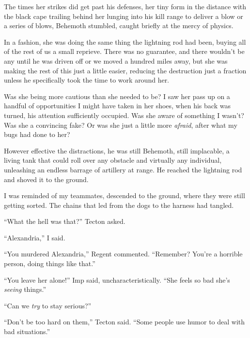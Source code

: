 The times her strikes did get past his defenses, her tiny form in the distance with the black cape trailing behind her lunging into his kill range to deliver a blow or a series of blows, Behemoth stumbled, caught briefly at the mercy of physics.



In a fashion, she was doing the same thing the lightning rod had been, buying all of the rest of us a small reprieve.  There was no guarantee, and there wouldn't be any until he was driven off or we moved a hundred miles away, but she was making the rest of this just a little easier, reducing the destruction just a fraction unless he specifically took the time to work around her.



Was she being more cautious than she needed to be?  I saw her pass up on a handful of opportunities I might have taken in her shoes, when his back was turned, his attention sufficiently occupied.  Was she aware of something I wasn't?  Was she a convincing fake?  Or was she just a little more \emph{afraid}, after what my bugs had done to her?



However effective the distractions, he was still Behemoth, still implacable, a living tank that could roll over any obstacle and virtually any individual, unleashing an endless barrage of artillery at range.  He reached the lightning rod and shoved it to the ground.



I was reminded of my teammates, descended to the ground, where they were still getting sorted.  The chains that led from the dogs to the harness had tangled.



``What the hell was that?''  Tecton asked.



``Alexandria,'' I said.



``You murdered Alexandria,'' Regent commented.  ``Remember?  You're a horrible person, doing things like that.''



``You leave her alone!''  Imp said, uncharacteristically.  ``She feels so bad she's \emph{seeing} things.''



``Can we \emph{try} to stay serious?''



``Don't be too hard on them,'' Tecton said.  ``Some people use humor to deal with bad situations.''



